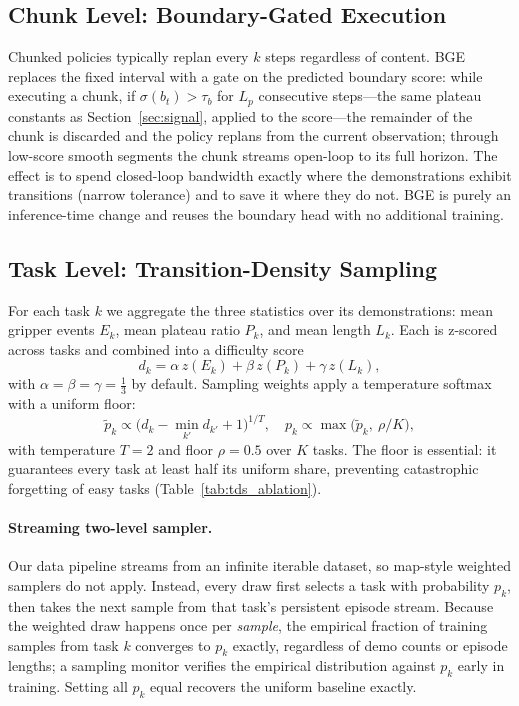 \documentclass[letterpaper]{article} %
\newcommand{\bge}{BGE}    %
\begin{document}
\subsection{Chunk Level: Boundary-Gated Execution}
Chunked policies typically replan every $k$ steps regardless of content. \bge{} replaces the fixed interval with a gate on the predicted boundary score: while executing a chunk, if $\sigma(b_t) > \tau_b$ for $L_p$ consecutive steps---the same plateau constants as Section~\ref{sec:signal}, applied to the score---the remainder of the chunk is discarded and the policy replans from the current observation; through low-score smooth segments the chunk streams open-loop to its full horizon. The effect is to spend closed-loop bandwidth exactly where the demonstrations exhibit transitions (narrow tolerance) and to save it where they do not. \bge{} is purely an inference-time change and reuses the boundary head with no additional training.

\subsection{Task Level: Transition-Density Sampling}
\label{sec:tds}
For each task $k$ we aggregate the three statistics over its demonstrations: mean gripper events $E_k$, mean plateau ratio $P_k$, and mean length $L_k$. Each is z-scored across tasks and combined into a difficulty score
\begin{equation}
d_k = \alpha\, z(E_k) + \beta\, z(P_k) + \gamma\, z(L_k),
\label{eq:dk}
\end{equation}
with $\alpha=\beta=\gamma=\tfrac{1}{3}$ by default. Sampling weights apply a temperature softmax with a uniform floor:
\begin{equation}
\tilde{p}_k \propto \big(d_k - \min_{k'} d_{k'} + 1\big)^{1/T}, \quad
p_k \propto \max\!\big(\tilde{p}_k,\ \rho/K\big),
\label{eq:pk}
\end{equation}
with temperature $T=2$ and floor $\rho = 0.5$ over $K$ tasks. The floor is essential: it guarantees every task at least half its uniform share, preventing catastrophic forgetting of easy tasks (Table~\ref{tab:tds_ablation}).

\paragraph{Streaming two-level sampler.}
Our data pipeline streams from an infinite iterable dataset, so map-style weighted samplers do not apply. Instead, every draw first selects a task with probability $p_k$, then takes the next sample from that task's persistent episode stream. Because the weighted draw happens once per \emph{sample}, the empirical fraction of training samples from task $k$ converges to $p_k$ exactly, regardless of demo counts or episode lengths; a sampling monitor verifies the empirical distribution against $p_k$ early in training. Setting all $p_k$ equal recovers the uniform baseline exactly.
\end{document}
